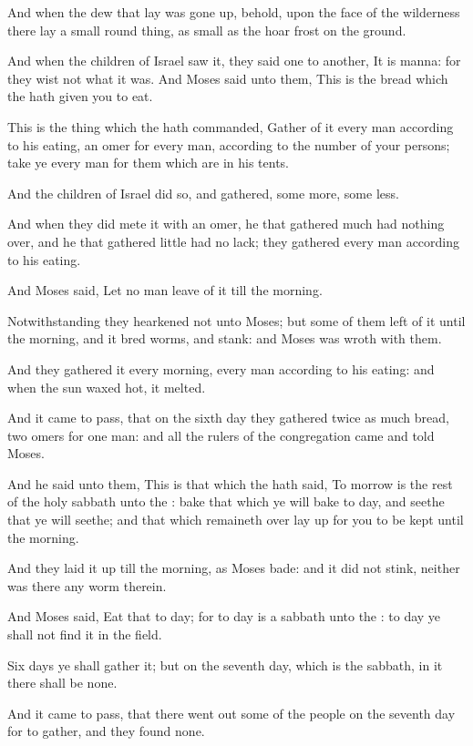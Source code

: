 \verse And when the dew that lay was gone up, behold, upon the face of the wilderness there lay a small round thing, as small as the hoar frost on the ground.

\verse And when the children of Israel saw it, they said one to another, It is manna: for they wist not what it was. And Moses said unto them, This is the bread which the \LORD hath given you to eat.

\verse This is the thing which the \LORD hath commanded, Gather of it every man according to his eating, an omer for every man, according to the number of your persons; take ye every man for them which are in his tents.

\verse And the children of Israel did so, and gathered, some more, some less.

\verse And when they did mete it with an omer, he that gathered much had nothing over, and he that gathered little had no lack; they gathered every man according to his eating.

\verse And Moses said, Let no man leave of it till the morning.

\verse Notwithstanding they hearkened not unto Moses; but some of them left of it until the morning, and it bred worms, and stank: and Moses was wroth with them.

\verse And they gathered it every morning, every man according to his eating: and when the sun waxed hot, it melted.

\verse And it came to pass, that on the sixth day they gathered twice as much bread, two omers for one man: and all the rulers of the congregation came and told Moses.

\verse And he said unto them, This is that which the \LORD hath said, To morrow is the rest of the holy sabbath unto the \LORD: bake that which ye will bake to day, and seethe that ye will seethe; and that which remaineth over lay up for you to be kept until the morning.

\verse And they laid it up till the morning, as Moses bade: and it did not stink, neither was there any worm therein.

\verse And Moses said, Eat that to day; for to day is a sabbath unto the \LORD: to day ye shall not find it in the field.

\verse Six days ye shall gather it; but on the seventh day, which is the sabbath, in it there shall be none.

\verse And it came to pass, that there went out some of the people on the seventh day for to gather, and they found none.

